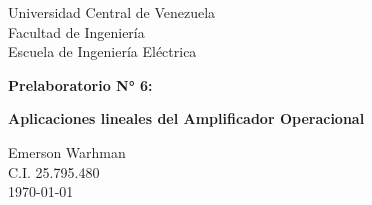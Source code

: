\begin{titlepage}
    \centering
    \Large
    Universidad Central de Venezuela\\
    Facultad de Ingeniería\\
    Escuela de Ingeniería Eléctrica
    \vspace*{8cm}

    \Huge
    \textbf{Prelaboratorio N° 6: } 

    \textbf{Aplicaciones lineales del Amplificador Operacional}
    \vfill


    \Large

    Emerson Warhman \\
    C.I. 25.795.480 \\
    \today

\end{titlepage}